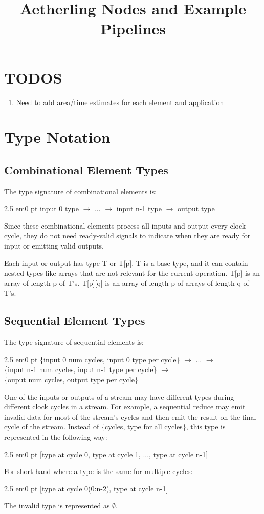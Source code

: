 \documentclass[11pt,fleqn]{article}
\numberwithin{equation}{subsection}
\begin{document}
\title{Aetherling Nodes and Example Pipelines}

\section{TODOS}
\begin{enumerate}
    \item Need to add area/time estimates for each element and application
\end{enumerate}

\section{Type Notation}

\subsection{Combinational Element Types}
The type signature of combinational elements is:
\begin{adjustwidth}{2.5 em}{0 pt}
    input 0 type $\rightarrow$ ... $\rightarrow$ input n-1 type $\rightarrow$ output type
\end{adjustwidth}
Since these combinational elements process all inputs and output every 
clock cycle, they do not need ready-valid signals to indicate when they are
ready for input or emitting valid outputs.

Each input or output has type T or T[p]. T is a base type, and it can contain 
nested types like arrays that are not relevant for the current operation. T[p] 
is an array of length p of T's. T[p][q] is an array of length p of arrays of 
length q of T's.

\subsection{Sequential Element Types}
The type signature of sequential elements is:
\begin{adjustwidth}{2.5 em}{0 pt}
    \{input 0 num cycles, input 0 type per cycle\} $\rightarrow$ ...
    $\rightarrow$ \\
    \{input n-1 num cycles, input n-1 type per cycle\} $\rightarrow$ \\ 
    \{ouput num cycles, output type per cycle\}
\end{adjustwidth}

One of the inputs or outputs of a stream may have different types during different
clock cycles in a stream. For example, a sequential reduce may emit invalid 
data for most of the stream's cycles and then emit the result on the final
cycle of the stream. Instead of \{cycles, type for all cycles\}, 
this type is represented in the following way:
\begin{adjustwidth}{2.5 em}{0 pt}
    [type at cycle 0, type at cycle 1, ..., type at cycle n-1]
\end{adjustwidth}
For short-hand where a type is the same for multiple cycles:
\begin{adjustwidth}{2.5 em}{0 pt}
    [type at cycle 0(0:n-2), type at cycle n-1]
\end{adjustwidth}
The invalid type is represented as $\emptyset$.
\end{document}
